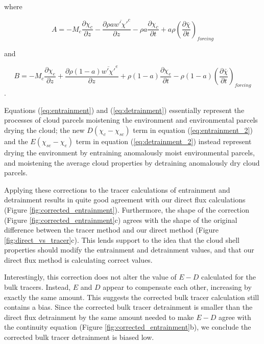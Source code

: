 \documentclass[12pt]{article}
\begin{document}
where

\begin{equation}
  \label{eq:A_equation}
    A = - M_c \frac{\partial \chi_c}{\partial z}
        - \frac{\partial \rho a \overline{w' \chi'}^c}{\partial z}
        - \rho a \frac{\partial \chi_c}{\partial t}
        + a \rho \left(\frac{\partial \bar{\chi}}{\partial t}\right)_{forcing}
\end{equation}

and

\begin{equation}
  \label{eq:B_equation}
    B = - M_c \frac{\partial \chi_e}{\partial z}
        + \frac{\partial \rho (1 - a) \overline{w' \chi'}^e}{\partial z}
        + \rho (1 - a) \frac{\partial \chi_e}{\partial t}
        - \rho (1 - a) \left(\frac{\partial \bar{\chi}}{\partial t}\right)_{forcing}
\end{equation}.

Equations (\ref{eq:entrainment}) and (\ref{eq:detrainment}) essentially 
represent the processes of cloud parcels moistening the environment and 
environmental parcels drying the cloud; the new $D (\chi_c - \chi_{sc})$ term
in equation (\ref{eq:entrainment_2}) and the $E (\chi_{se} - \chi_e)$ term in
equation (\ref{eq:detrainment_2}) instead represent drying the environment
by entraining anomalously moist environmental parcels, and moistening the
average cloud properties by detraining anomalously dry cloud parcels.

Applying these corrections to the tracer calculations of entrainment and 
detrainment results in quite good agreement with our direct flux calculations 
(Figure \ref{fig:corrected_entrainment}).  Furthermore, the shape of the 
correction (Figure \ref{fig:corrected_entrainment}c) agrees with the shape of 
the original difference between the tracer method and our direct method 
(Figure \ref{fig:direct_vs_tracer}c). This lends support to the idea that 
the cloud shell properties should modify the entrainment and detrainment
values, and that our direct flux method is calculating correct values.

Interestingly, this correction does not alter the value of $E-D$ calculated
for the bulk tracers.  Instead, $E$ and $D$ appear to compensate each other,
increasing by exactly the same amount.  This suggests the corrected bulk 
tracer calculation still contains a bias.  Since the corrected bulk tracer 
detrainment is smaller than the direct flux detrainment by the same amount 
needed to make $E-D$ agree with the continuity equation (Figure 
\ref{fig:corrected_entrainment}b), we conclude the corrected bulk tracer
detrainment is biased low.
\end{document}
